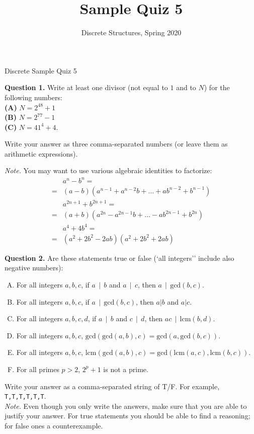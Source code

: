 \documentclass[jou]{apa6}
\title{Sample Quiz 5}
\author{Discrete Structures, Spring 2020}
\affiliation{RBS}
\begin{document}
\thispagestyle{empty}

\twocolumn
{\Large Discrete Sample Quiz 5}

\vspace{4pt}
{\bf Question 1.} Write at least one divisor (not equal to $1$ and to $N$) for the following numbers:\\
{\bf (A)} $N = 2^{48} + 1$\\
{\bf (B)} $N = 2^{77} - 1$\\
{\bf (C)} $N = 41^4 + 4$. 

Write your answer as three comma-separated numbers (or leave them as arithmetic expressions).

{\em Note.} You may want to use various algebraic identities to factorize:
\begin{align}
 & a^n - b^n = \nonumber \\
= & (a-b)\left(a^{n-1} + a^{n-2}b + \ldots + ab^{n-2} + b^{n-1}\right) \nonumber \\
 & a^{2n+1} + b^{2n+1} = \nonumber \\
= & (a+b)\left(a^{2n} - a^{2n-1}b + \ldots - ab^{2n-1} + b^{2n}\right) \nonumber \\
 & a^4 + 4b^4 = \nonumber \\
= & (a^2 + 2b^2 - 2ab) (a^2 + 2b^2 + 2ab) \nonumber
\end{align}



\vspace{10pt}
{\bf Question 2.} Are these statements true or false (`all integers'' include also negative numbers):
\begin{enumerate}[(A)]
\item For all integers $a,b,c$, if $a\,\mid\,b$ and $a\,\mid\,c$, then $a\,\mid\,\text{gcd}(b,c)$.
\item For all integers $a,b,c$, if $a\,\mid\,\text{gcd}(b,c)$, then $a|b$ and $a|c$.
\item For all integers $a,b,c,d$, if $a\,\mid\,b$ and $c\,\mid\,d$, then $ac\,\mid\,\text{lcm}(b,d)$.
\item For all integers $a,b,c$, $\text{gcd}(\text{gcd}(a,b),c) = \text{gcd}(a,\text{gcd}(b,c))$. 
\item For all integers $a,b,c$, $\text{lcm}(\text{gcd}(a,b),c) = \text{gcd}(\text{lcm}(a,c), \text{lcm}(b,c))$. 
\item For all primes $p>2$, $2^p +1$ is not a prime.
\end{enumerate}

Write your answer as a comma-separated string of T/F. For example, {\tt T,T,T,T,T,T}.\\
{\em Note.} Even though you only write the answers, 
make sure that you are able to justify your answer. For true statements you should be able to 
find a reasoning; for false ones \textendash{} a counterexample. 
\end{document}
